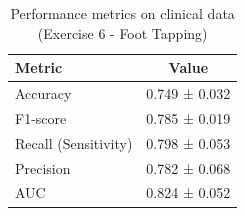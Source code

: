 \begin{table}[H]
\centering
\caption{Performance metrics on clinical data (Exercise 6 - Foot Tapping)}
\label{tab:performance}
\begin{tabular}{lc}
\toprule
\textbf{Metric} & \textbf{Value} \\
\midrule
Accuracy & 0.749 ± 0.032 \\
F1-score & 0.785 ± 0.019 \\
Recall (Sensitivity) & 0.798 ± 0.053 \\
Precision & 0.782 ± 0.068 \\
AUC & 0.824 ± 0.052 \\
\bottomrule
\end{tabular}
\end{table}

